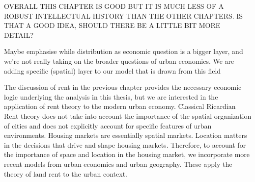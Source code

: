 





{\color{red} OVERALL THIS CHAPTER IS GOOD BUT IT IS MUCH LESS OF A ROBUST INTELLECTUAL HISTORY THAN THE OTHER CHAPTERS. IS THAT A GOOD IDEA, SHOULD THERE BE A LITTLE BIT MORE DETAIL?

Maybe emphasise
while distribution as economic question is a bigger layer, and we're not really taking on the broader questions of urban economics. We are adding specific (spatial) layer to our model that is drawn from this field
}

The discussion of rent in the previous chapter provides the necessary economic logic
underlying the analysis in this thesis, but we are interested in the application of rent theory to the modern urban economy. Classical Ricardian Rent theory does not take into account the importance of the spatial organization of cities and does not explicitly account for specific features of urban environments. Housing markets are essentially spatial markets. Location matters in the decisions that drive and shape housing markets. Therefore, to account for the importance of space and location in the housing market, we incorporate  more recent models from urban economics and urban geography. These apply the theory of land rent to the urban context.

